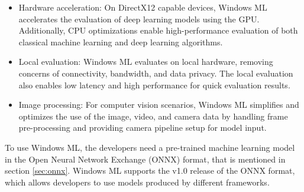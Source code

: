 \begin{itemize}
\item Hardware acceleration: On DirectX12 capable devices, Windows ML accelerates the evaluation of deep learning models using the GPU. Additionally, CPU optimizations enable high-performance evaluation of both classical machine learning and deep learning algorithms.
\item Local evaluation: Windows ML evaluates on local hardware, removing concerns of connectivity, bandwidth, and data privacy. The local evaluation also enables low latency and high performance for quick evaluation results.
\item Image processing: For computer vision scenarios, Windows ML simplifies and optimizes the use of the image, video, and camera data by handling frame pre-processing and providing camera pipeline setup for model input.
\end{itemize}
 
To use Windows ML, the developers need a pre-trained machine learning model in the Open Neural Network Exchange (ONNX) format, that is mentioned in section \ref{sec:onnx}. 
Windows ML supports the v1.0 release of the ONNX format, which allows developers to use models produced by different frameworks.

